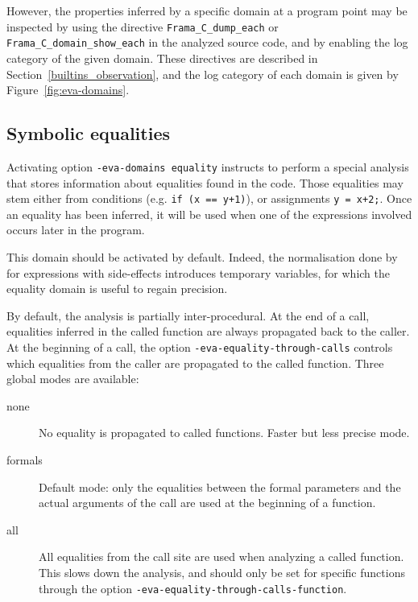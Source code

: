 \documentclass{frama-c-book}
\begin{document}
However, the properties inferred by a specific domain at a program point may be
inspected by using the directive \lstinline+Frama_C_dump_each+ or
\lstinline+Frama_C_domain_show_each+ in the analyzed source code, and by
enabling the log category of the given domain. These directives are described
in Section~\ref{builtins_observation}, and the log category of each domain
is given by Figure~\ref{fig:eva-domains}.

\subsection{Symbolic equalities}
\label{sec:symbolic-equalities}

Activating option \texttt{-eva-domains equality} instructs
\Eva{} to perform a special analysis that stores information
about equalities found in the code. Those equalities may stem either
from conditions (e.g. \texttt{if (x == y+1)}), or assignments
\texttt{y = x+2;}. Once an equality has been inferred, it will
be used when one of the expressions involved occurs later in the program.


\begin{listing-nonumber}
  int y = x+1;
  // the equality y == x + 1 is inferred
  if (y <= 2) {
    // Thanks to the equality, x <= 1 is deduced
  }
}
\end{listing-nonumber}

This domain should be activated by default. Indeed, the normalisation
done by \FramaC for expressions with side-effects introduces temporary
variables, for which the equality domain is useful to regain
precision.

By default, the analysis is partially inter-procedural.
At the end of a call, equalities inferred in the called function are always
propagated back to the caller.
At the beginning of a call, the option \verb+-eva-equality-through-calls+
controls which equalities from the caller are propagated to the called function.
Three global modes are available:
\begin{description}
\item[none] No equality is propagated to called functions. Faster but less
  precise mode.
\item[formals] Default mode: only the equalities between the formal parameters
  and the actual arguments of the call are used at the beginning
  of a function.
\item[all] All equalities from the call site are used when analyzing a called
  function.  This slows down the analysis, and should only be set for specific
  functions through the option \verb+-eva-equality-through-calls-function+.
\end{description}
\end{document}

